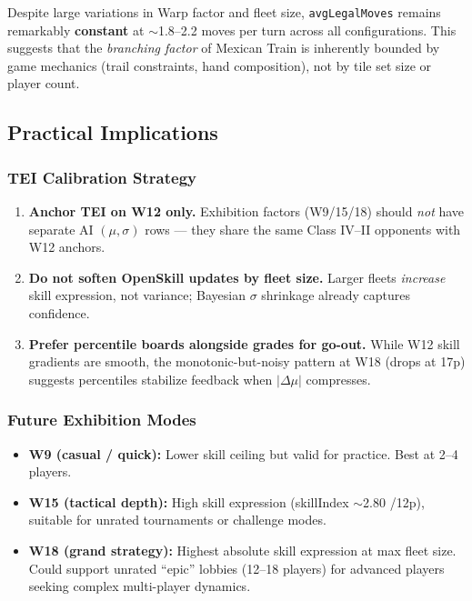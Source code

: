 \documentclass[11pt,letterpaper]{article}
\begin{document}
Despite large variations in Warp factor and fleet size, \texttt{avgLegalMoves} remains remarkably \textbf{constant} at $\sim$1.8--2.2 moves per turn across all configurations. This suggests that the \textit{branching factor} of Mexican Train is inherently bounded by game mechanics (trail constraints, hand composition), not by tile set size or player count.

\subsection{Practical Implications}

\subsubsection{TEI Calibration Strategy}

\begin{enumerate}
\item \textbf{Anchor TEI on W12 only.} Exhibition factors (W9/15/18) should \textit{not} have separate AI $(\mu,\sigma)$ rows --- they share the same Class IV--II opponents with W12 anchors.
\item \textbf{Do not soften OpenSkill updates by fleet size.} Larger fleets \textit{increase} skill expression, not variance; Bayesian $\sigma$ shrinkage already captures confidence.
\item \textbf{Prefer percentile boards alongside grades for go-out.} While W12 skill gradients are smooth, the monotonic-but-noisy pattern at W18 (drops at 17p) suggests percentiles stabilize feedback when $|\Delta\mu|$ compresses.
\end{enumerate}

\subsubsection{Future Exhibition Modes}

\begin{itemize}
\item \textbf{W9 (casual / quick):} Lower skill ceiling but valid for practice. Best at 2--4 players.
\item \textbf{W15 (tactical depth):} High skill expression (skillIndex $\sim$2.80 /12p), suitable for unrated tournaments or challenge modes.
\item \textbf{W18 (grand strategy):} Highest absolute skill expression at max fleet size. Could support unrated ``epic'' lobbies (12--18 players) for advanced players seeking complex multi-player dynamics.
\end{itemize}
\end{document}
